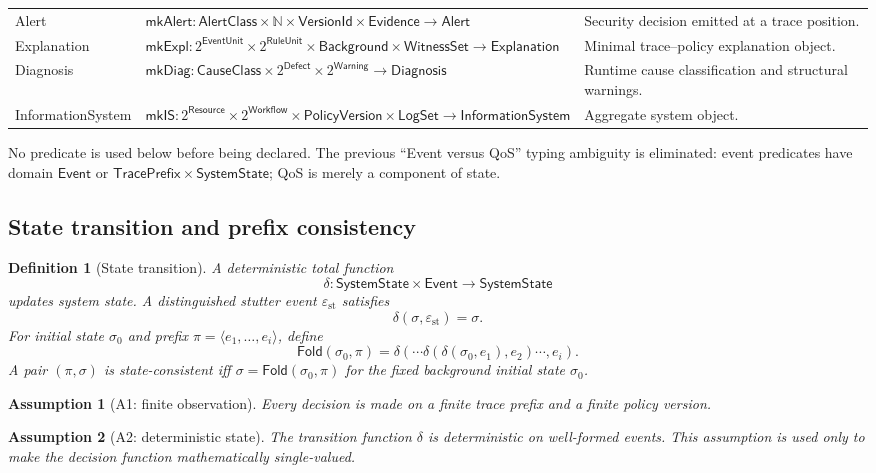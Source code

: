 \documentclass[11pt]{article}
\newtheorem{definition}{Definition}[section]
\newtheorem{assumption}{Assumption}[section]
\theoremstyle{remark}
\newcommand{\Nat}{\mathbb{N}}
\newcommand{\stutter}{\varepsilon_{\mathrm{st}}}
\begin{document}
\begin{longtable}{>{\raggedright\arraybackslash}p{2.6cm} p{4.2cm} p{6.5cm}}
Alert & $\mathsf{mkAlert}:\mathsf{AlertClass}\times\Nat\times\mathsf{VersionId}\times\mathsf{Evidence}\to\mathsf{Alert}$ & Security decision emitted at a trace position.\\
Explanation & $\mathsf{mkExpl}:2^{\mathsf{EventUnit}}\times2^{\mathsf{RuleUnit}}\times\mathsf{Background}\times\mathsf{WitnessSet}\to\mathsf{Explanation}$ & Minimal trace--policy explanation object.\\
Diagnosis & $\mathsf{mkDiag}:\mathsf{CauseClass}\times2^{\mathsf{Defect}}\times2^{\mathsf{Warning}}\to\mathsf{Diagnosis}$ & Runtime cause classification and structural warnings.\\
InformationSystem & $\mathsf{mkIS}:2^{\mathsf{Resource}}\times2^{\mathsf{Workflow}}\times\mathsf{PolicyVersion}\times\mathsf{LogSet}\to\mathsf{InformationSystem}$ & Aggregate system object.\\
\bottomrule
\end{longtable}

No predicate is used below before being declared. The previous ``Event versus QoS'' typing ambiguity is eliminated: event predicates have domain $\mathsf{Event}$ or $\mathsf{TracePrefix}\times\mathsf{SystemState}$; QoS is merely a component of state.

\subsection{State transition and prefix consistency}

\begin{definition}[State transition]
A deterministic total function
\[
\delta:\mathsf{SystemState}\times\mathsf{Event}\to\mathsf{SystemState}
\]
updates system state. A distinguished stutter event $\stutter$ satisfies
\[
\delta(\sigma,\stutter)=\sigma.
\]
For initial state $\sigma_0$ and prefix $\pi=\langle e_1,\ldots,e_i\rangle$, define
\[
\mathsf{Fold}(\sigma_0,\pi)=\delta(\cdots\delta(\delta(\sigma_0,e_1),e_2)\cdots,e_i).
\]
A pair $(\pi,\sigma)$ is \emph{state-consistent} iff $\sigma=\mathsf{Fold}(\sigma_0,\pi)$ for the fixed background initial state $\sigma_0$.
\end{definition}

\begin{assumption}[A1: finite observation]
Every decision is made on a finite trace prefix and a finite policy version.
\end{assumption}

\begin{assumption}[A2: deterministic state]
The transition function $\delta$ is deterministic on well-formed events. This assumption is used only to make the decision function mathematically single-valued.
\end{assumption}
\end{document}
